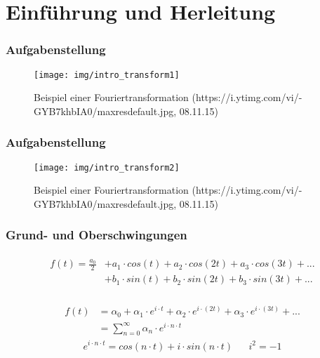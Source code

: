 \section{Einführung und Herleitung}

\begin{frame}
  \frametitle{Aufgabenstellung}

  \begin{figure}
    \centering
    \texttt{[image: img/intro\_transform1]}
    \caption{Beispiel einer Fouriertransformation (https://i.ytimg.com/vi/-GYB7khbIA0/maxresdefault.jpg, 08.11.15)}
  \end{figure}
\end{frame}

\begin{frame}
  \frametitle{Aufgabenstellung}

  \begin{figure}
    \centering
    \texttt{[image: img/intro\_transform2]}
    \caption{Beispiel einer Fouriertransformation (https://i.ytimg.com/vi/-GYB7khbIA0/maxresdefault.jpg, 08.11.15)}
  \end{figure}
\end{frame}

\begin{frame}
  \frametitle{Grund- und Oberschwingungen}

  \begin{align*}
    \begin{split}
      f(t) = \frac{a_0}{2} &+ a_1 \cdot cos(t) + a_2 \cdot cos(2 t) + a_3 \cdot cos(3 t) + ... \\ &+ b_1 \cdot sin(t) + b_2 \cdot sin(2 t) +  b_3 \cdot sin(3 t) + ... \\
    \end{split}
  \end{align*}

  \begin{align*}
    f(t) &= \alpha_0 + \alpha_1 \cdot e^{i \cdot t} + \alpha_2 \cdot e^{i \cdot ( 2 t)} + \alpha_3 \cdot e^{i \cdot (3 t)} + ... \\
         &= \sum_{n = 0}^{\infty} \alpha_n \cdot e^{i\cdot  n\cdot  t}
  \end{align*}
  \begin{align*}
    e^{i \cdot n \cdot t} = cos(n \cdot t) + i \cdot sin(n \cdot t) && i^2 = -1
  \end{align*}
\end{frame}

